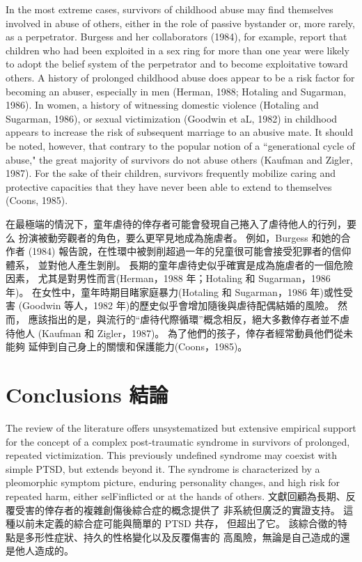 \documentclass[12pt]{article}
\begin{document}
    In the most extreme cases, survivors of childhood abuse may find themselves
    involved in abuse of others, either in the role of passive bystander or,
    more rarely, as a perpetrator. Burgess and her collaborators (1984), for
    example, report that children who had been exploited in a sex ring for more
    than one year were likely to adopt the belief system of the perpetrator and
    to become exploitative toward others. A history of prolonged childhood
    abuse does appear to be a risk factor for becoming an abuser, especially in
    men (Herman, 1988; Hotaling and Sugarman, 1986). In women, a history of
    witnessing domestic violence (Hotaling and Sugarman, 1986), or sexual
    victimization (Goodwin et aL, 1982) in childhood appears to increase the
    risk of subsequent marriage to an abusive mate. It should be noted,
    however, that contrary to the popular notion of a ``generational cycle of
    abuse," the great majority of survivors do not abuse others (Kaufman and
    Zigler, 1987). For the sake of their children, survivors frequently
    mobilize caring and protective capacities that they have never been able to
    extend to themselves (Coons, 1985).

    在最極端的情況下，童年虐待的倖存者可能會發現自己捲入了虐待他人的行列，要么
    扮演被動旁觀者的角色，要么更罕見地成為施虐者。 例如，Burgess 和她的合作者
    (1984) 報告說，在性環中被剝削超過一年的兒童很可能會接受犯罪者的信仰體系，
    並對他人產生剝削。 長期的童年虐待史似乎確實是成為施虐者的一個危險因素，
    尤其是對男性而言(Herman，1988 年；Hotaling 和 Sugarman，1986 年)。
    在女性中，童年時期目睹家庭暴力(Hotaling 和 Sugarman，1986 年)或性受害
    (Goodwin 等人，1982 年)的歷史似乎會增加隨後與虐待配偶結婚的風險。 然而，
    應該指出的是，與流行的“虐待代際循環”概念相反，絕大多數倖存者並不虐待他人
    (Kaufman 和 Zigler，1987)。 為了他們的孩子，倖存者經常動員他們從未能夠
    延伸到自己身上的關懷和保護能力(Coons，1985)。

\section{Conclusions 結論}

    The review of the literature offers unsystematized but extensive empirical
    support for the concept of a complex post-traumatic syndrome in survivors
    of prolonged, repeated victimization. This previously undefined syndrome
    may coexist with simple PTSD, but extends beyond it. The syndrome is
    characterized by a pleomorphic symptom picture, enduring personality
    changes, and high risk for repeated harm, either selFinflicted or at the
    hands of others.
    文獻回顧為長期、反覆受害的倖存者的複雜創傷後綜合症的概念提供了
    非系統但廣泛的實證支持。 這種以前未定義的綜合症可能與簡單的 PTSD 共存，
    但超出了它。 該綜合徵的特點是多形性症狀、持久的性格變化以及反覆傷害的
    高風險，無論是自己造成的還是他人造成的。
\end{document}
